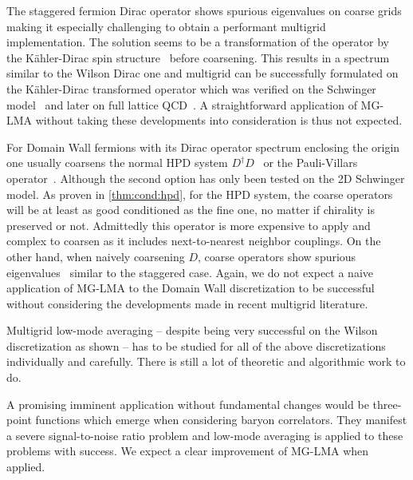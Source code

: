 The staggered fermion Dirac operator shows spurious eigenvalues on coarse grids~\cite{Brower:2018ymy} making it especially challenging to obtain a performant multigrid implementation.
The solution seems to be a transformation of the operator by the Kähler-Dirac spin structure~\cite{Becher:1982ud,Bodwin:1987ah} before coarsening.
This results in a spectrum similar to the Wilson Dirac one and multigrid can be successfully formulated on the Kähler-Dirac transformed operator which was verified on the Schwinger model~\cite{Brower:2018ymy} and later on full lattice QCD~\cite{Ayyar:2022krp}.
A straightforward application of MG-LMA without taking these developments into consideration is thus not expected.

For Domain Wall fermions with its Dirac operator spectrum enclosing the origin one usually coarsens the normal HPD system $D^{\dagger} D$~\cite{Cohen:2011ivh,Boyle:2014rwa} or the Pauli-Villars operator~\cite{Brower:2020xmc}.
Although the second option has only been tested on the 2D Schwinger model.
As proven in \cref{thm:cond:hpd}, for the HPD system, the coarse operators will be at least as good conditioned as the fine one, no matter if chirality is preserved or not.
Admittedly this operator is more expensive to apply and complex to coarsen as it includes next-to-nearest neighbor couplings.
On the other hand, when naively coarsening $D$, coarse operators show spurious eigenvalues~\cite{Brower:2020xmc} similar to the staggered case.
Again, we do not expect a naive application of MG-LMA to the Domain Wall discretization to be successful without considering the developments made in recent multigrid literature.

Multigrid low-mode averaging -- despite being very successful on the Wilson discretization as shown -- has to be studied for all of the above discretizations individually and carefully.
There is still a lot of theoretic and algorithmic work to do.

A promising imminent application without fundamental changes would be three-point functions which emerge when considering baryon correlators.
They manifest a severe signal-to-noise ratio problem and low-mode averaging is applied to these problems with success.
We expect a clear improvement of MG-LMA when applied.


